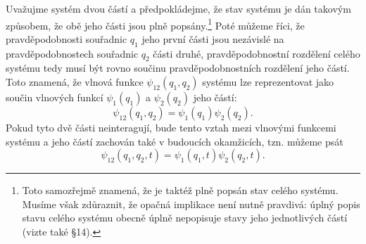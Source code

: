Uvažujme systém dvou částí a předpokládejme, že stav systému je dán takovým způsobem, že obě jeho části jsou plně popsány.\footnote{Toto samozřejmě znamená, že je taktéž plně popsán stav celého systému. Musíme však zdůraznit, že opačná implikace není nutně pravdivá: úplný popis stavu celého systému obecně úplně nepopisuje stavy jeho jednotlivých částí (vizte také §14).} Poté můžeme říci, že pravděpodobnosti souřadnic \(q_1\) jeho první části jsou nezávislé na pravděpodobnostech souřadnic \(q_2\) části druhé, pravděpodobnostní rozdělení celého systému tedy musí být rovno součinu pravděpodobnostních rozdělení jeho částí. Toto znamená, že vlnová funkce \(\psi_{12}(q_1, q_2)\) systému lze reprezentovat jako součin vlnových funkcí \(\psi_1(q_1)\) a \(\psi_2(q_2)\) jeho částí:
\begin{equation}
    \psi_{12}(q_1,q_2) = \psi_1(q_1)\psi_2(q_2).
\end{equation}
Pokud tyto dvě části neinteragují, bude tento vztah mezi vlnovými funkcemi systému a jeho částí zachován také v budoucích okamžicích, tzn. můžeme psát
\begin{equation}
    \psi_{12}(q_1,q_2,t) = \psi_1(q_1,t)\psi_2(q_2,t).
\end{equation}
